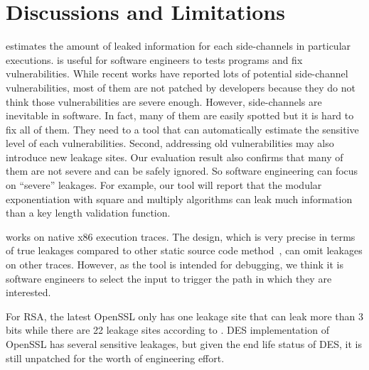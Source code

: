 \section{Discussions and Limitations}
\tool{} estimates the amount of leaked information for each side-channels
in particular executions. \tool{} is useful for software
engineers to tests programs and fix vulnerabilities. 
While recent works have reported lots
of potential side-channel vulnerabilities, most of them are not patched by
developers because they do not think those vulnerabilities are severe enough.
However, side-channels are inevitable in software. In fact, many of them
are easily spotted but it is hard to fix all of them. They need to a
tool that can automatically estimate the sensitive level of each vulnerabilities.
Second, addressing old vulnerabilities may also introduce new leakage
sites.  Our evaluation result also confirms that many of them are not 
severe and can be safely ignored. So software engineering can focus on
``severe'' leakages. For example, our tool will report that 
the modular exponentiation with square and multiply algorithms can
leak much information than a key length validation function.

\tool{} works on native x86 execution traces. The design, which is very
precise in terms of true leakages compared to other static source code
method~\cite{197207,BacelarAlmeida:2013:FVS:2483313.2483334}, can omit
leakages on other traces. However, as the tool is intended for debugging,
we think it is software engineers to select the input to trigger the 
path in which they are interested.


For RSA, the latest
OpenSSL only has one leakage site that can leak more than 3 bits while there
are 22 leakage sites according to \tool{}. DES implementation of OpenSSL has
several sensitive leakages, but given the end life status of DES, it is still
unpatched for the worth of engineering effort. 
%

